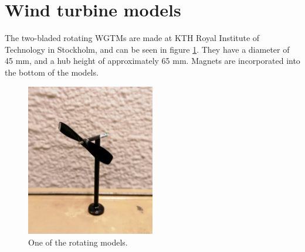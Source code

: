 \section{Wind turbine models}
The two-bladed rotating \gls{WGTM}s are made at KTH Royal Institute of Technology in Stockholm, and can be seen in figure \ref{fig:rwtm}. They have a diameter of 45 \si{\mm}, and a hub height of approximately 65 \si{\mm}. Magnets are incorporated into the bottom of the models. 


\begin{figure} 
    \centering
    \includegraphics[width=0.5\textwidth]{0_Images/RWTM.jpg}    
    \caption{One of the rotating models.}
    \label{fig:rwtm}
\end{figure}

\FloatBarrier